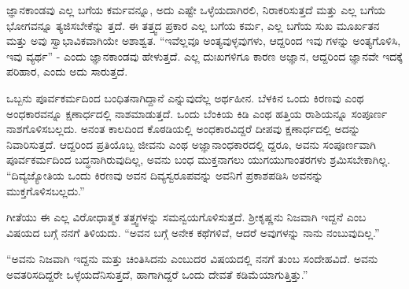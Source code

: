 ಜ್ಞಾನಕಾಂಡವು ಎಲ್ಲ ಬಗೆಯ ಕರ್ಮವನ್ನೂ, ಅದು ಎಷ್ಟೇ ಒಳ್ಳೆಯದಾಗಿರಲಿ, ನಿರಾಕರಿಸುತ್ತದೆ ಮತ್ತು ಎಲ್ಲ ಬಗೆಯ ಭೋಗವನ್ನೂ ತ್ಯಜಿಸಬೇಕೆನ್ನು ತ್ತದೆ. ಈ ತತ್ತ್ವದ ಪ್ರಕಾರ ಎಲ್ಲ ಬಗೆಯ ಕರ್ಮ, ಎಲ್ಲ ಬಗೆಯ ಸುಖ ಮೂರ್ಖತನ ಮತ್ತು ಅವು ಸ್ವಾಭಾವಿಕವಾಗಿಯೇ ಅಶಾಶ್ವತ. “ಇವೆಲ್ಲವೂ ಅಂತ್ಯವುಳ್ಳವುಗಳು, ಆದ್ದರಿಂದ ಇವು ಗಳನ್ನು ಅಂತ್ಯಗೊಳಿಸಿ, ಇವು ವ್ಯರ್ಥ” - ಎಂದು ಜ್ಞಾನಕಾಂಡವು ಹೇಳುತ್ತದೆ. ಎಲ್ಲ ದುಃಖಗಳಿಗೂ ಕಾರಣ ಅಜ್ಞಾನ, ಆದ್ದರಿಂದ ಜ್ಞಾನವೇ ಇದಕ್ಕೆ ಪರಿಹಾರ, ಎಂದು ಅದು ಸಾರುತ್ತದೆ.

ಒಬ್ಬನು ಪೂರ್ವಕರ್ಮದಿಂದ ಬಂಧಿತನಾಗಿದ್ದಾನೆ ಎನ್ನುವುದೆಲ್ಲ ಅರ್ಥಹೀನ. ಬೆಳಕಿನ ಒಂದು ಕಿರಣವು ಎಂಥ ಅಂಧಕಾರವನ್ನೂ ಕ್ಷಣಾರ್ಧದಲ್ಲಿ ನಾಶಮಾಡುತ್ತದೆ. ಒಂದು ಬೆಂಕಿಯ ಕಿಡಿ ಎಂಥ ಹತ್ತಿಯ ರಾಶಿಯನ್ನೂ ಸಂಪೂರ್ಣ ನಾಶಗೊಳಿಸಬಲ್ಲದು. ಅನಂತ ಕಾಲದಿಂದ ಕೊಠಡಿಯಲ್ಲಿ ಅಂಧಕಾರವಿದ್ದರೆ ದೀಪವು ಕ್ಷಣಾರ್ಧದಲ್ಲಿ ಅದನ್ನು ನಿವಾರಿಸುತ್ತದೆ. ಆದ್ದರಿಂದ ಪ್ರತಿಯೊಬ್ಬ ಜೀವನು ಎಂಥ ಅಜ್ಞಾನಾಂಧಕಾರದಲ್ಲಿ ದ್ದರೂ, ಅವನು ಸಂಪೂರ್ಣವಾಗಿ ಪೂರ್ವಕರ್ಮದಿಂದ ಬದ್ಧನಾಗಿರುವುದಿಲ್ಲ, ಅವನು ಬಂಧ ಮುಕ್ತನಾಗಲು ಯುಗಯುಗಾಂತರಗಳು ಶ್ರಮಿಸಬೇಕಾಗಿಲ್ಲ. “ದಿವ್ಯಜ್ಯೋತಿಯ ಒಂದು ಕಿರಣವು ಅವನ ದಿವ್ಯಸ್ವರೂಪವನ್ನು ಅವನಿಗೆ ಪ್ರಕಾಶಪಡಿಸಿ ಅವನನ್ನು ಮುಕ್ತಗೊಳಿಸಬಲ್ಲದು.”

ಗೀತೆಯು ಈ ಎಲ್ಲ ವಿರೋಧಾತ್ಮಕ ತತ್ತ್ವಗಳನ್ನು ಸಮನ್ವಯಗೊಳಿಸುತ್ತದೆ. ಶ‍್ರೀಕೃಷ್ಣನು ನಿಜವಾಗಿ ಇದ್ದನೆ ಎಂಬ ವಿಷಯದ ಬಗ್ಗೆ ನನಗೆ ತಿಳಿಯದು. “ಅವನ ಬಗ್ಗೆ ಅನೇಕ ಕಥೆಗಳಿವೆ, ಆದರೆ ಅವುಗಳನ್ನು ನಾನು ನಂಬುವುದಿಲ್ಲ.”

“ಅವನು ನಿಜವಾಗಿ ಇದ್ದನು ಮತ್ತು ಚಿಂತಿಸಿದನು ಎಂಬುದರ ವಿಷಯದಲ್ಲಿ ನನಗೆ ತುಂಬ ಸಂದೇಹವಿದೆ. ಅವನು ಅವತರಿಸದಿದ್ದರೇ ಒಳ್ಳೆಯದೆನಿಸುತ್ತದೆ, ಹಾಗಾಗಿದ್ದರೆ ಒಂದು ದೇವತೆ ಕಡಿಮೆಯಾಗುತ್ತಿತ್ತು.”


